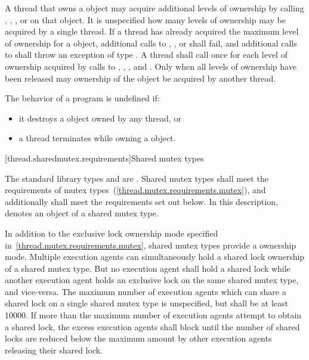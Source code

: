 \pnum
A thread that owns a  object may acquire additional
levels of ownership by calling , ,
, or  on that object. It is
unspecified how many levels of ownership may be acquired by a single thread. If
a thread has already acquired the maximum level of ownership for a
 object, additional calls to ,
, or  shall fail, and additional
calls to  shall throw an exception of type . A
thread shall call  once for each level of ownership acquired by
calls to , , , and
. Only when all levels of ownership have been released
may ownership of the object be acquired by another thread.

\pnum
The behavior of a program is undefined if:

\begin{itemize}
\item it destroys a  object owned by any thread, or
\item a thread terminates while owning a  object.
\end{itemize}


[thread.sharedmutex.requirements]{Shared mutex types}

\pnum
The standard library types  and 
are . Shared mutex types shall meet the requirements of
mutex types~(\ref{thread.mutex.requirements.mutex}), and additionally
shall meet the requirements set out below. In this description,
 denotes an object of a shared mutex type.

\pnum
In addition to the exclusive lock ownership mode specified
in~\ref{thread.mutex.requirements.mutex}, shared mutex types provide a
 ownership mode. Multiple execution agents can
simultaneously hold a shared lock ownership of a shared mutex type. But no
execution agent shall hold a shared lock while another execution agent holds an
exclusive lock on the same shared mutex type, and vice-versa. The maximum
number of execution agents which can share a shared lock on a single shared
mutex type is unspecified, but shall be at least 10000. If more than the
maximum number of execution agents attempt to obtain a shared lock, the
excess execution agents shall block until the number of shared locks are
reduced below the maximum amount by other execution agents releasing their
shared lock.


